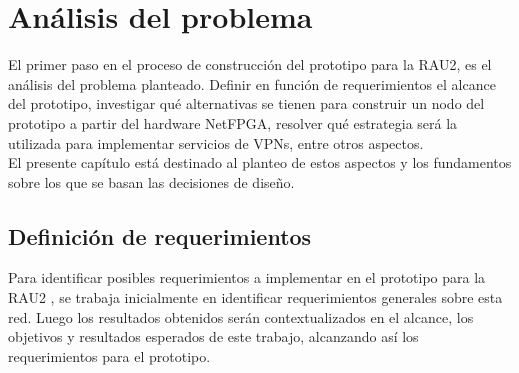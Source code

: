 \chapter{An\'alisis del problema}

\ifpdf
    \graphicspath{{Chapter3/Figs/Raster/}{Chapter3/Figs/PDF/}{Chapter3/Figs/}}
\else
    \graphicspath{{Chapter3/Figs/Vector/}{Chapter3/Figs/}}
\fi

El primer paso en el proceso de construcción del prototipo para la RAU2, es el análisis del problema planteado. Definir en función de requerimientos el alcance del prototipo, investigar qu\'e alternativas se tienen para construir un nodo del prototipo a partir del hardware NetFPGA, resolver qu\'e estrategia ser\'a la utilizada para implementar servicios de VPNs, entre otros aspectos.\\

El presente cap\'itulo est\'a destinado al planteo de estos aspectos y los fundamentos sobre los que se basan las decisiones de diseño. 




\section[Definición de requerimientos]{Definición de requerimientos}
\label{3.1}

Para identificar posibles requerimientos a implementar en el prototipo para la RAU2 , se trabaja inicialmente en identificar requerimientos generales sobre esta red. Luego los resultados obtenidos ser\'an contextualizados en el alcance, los objetivos y resultados esperados de este trabajo, alcanzando as\'i los requerimientos para el prototipo.\\

